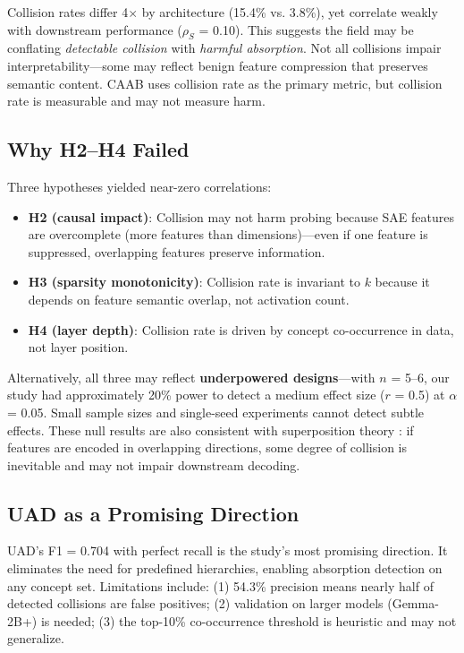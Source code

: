 \documentclass{article}
\begin{document}
Collision rates differ 4$\times$ by architecture (15.4\% vs. 3.8\%), yet correlate weakly with downstream performance ($\rho_S$ = 0.10). This suggests the field may be conflating \textit{detectable collision} with \textit{harmful absorption}. Not all collisions impair interpretability---some may reflect benign feature compression that preserves semantic content. CAAB uses collision rate as the primary metric, but collision rate is measurable and may not measure harm.

\subsection{Why H2--H4 Failed}

Three hypotheses yielded near-zero correlations:
\begin{itemize}
    \item \textbf{H2 (causal impact)}: Collision may not harm probing because SAE features are overcomplete (more features than dimensions)---even if one feature is suppressed, overlapping features preserve information.
    \item \textbf{H3 (sparsity monotonicity)}: Collision rate is invariant to $k$ because it depends on feature semantic overlap, not activation count.
    \item \textbf{H4 (layer depth)}: Collision rate is driven by concept co-occurrence in data, not layer position.
\end{itemize}

Alternatively, all three may reflect \textbf{underpowered designs}---with $n$ = 5--6, our study had approximately 20\% power to detect a medium effect size ($r$ = 0.5) at $\alpha$ = 0.05. Small sample sizes and single-seed experiments cannot detect subtle effects. These null results are also consistent with superposition theory \citep{elhage2022superposition}: if features are encoded in overlapping directions, some degree of collision is inevitable and may not impair downstream decoding.

\subsection{UAD as a Promising Direction}

UAD's F1 = 0.704 with perfect recall is the study's most promising direction. It eliminates the need for predefined hierarchies, enabling absorption detection on any concept set. Limitations include: (1) 54.3\% precision means nearly half of detected collisions are false positives; (2) validation on larger models (Gemma-2B+) is needed; (3) the top-10\% co-occurrence threshold is heuristic and may not generalize.
\end{document}
